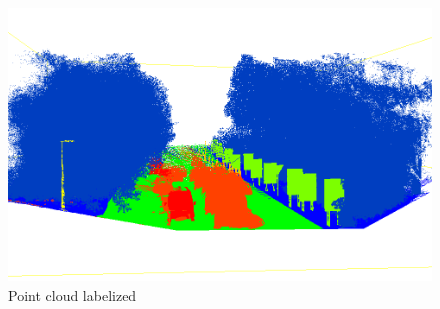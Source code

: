\begin{figure}[H]
    \centering
	\includegraphics[scale=0.3]{sources/pic2.png}
	\caption{Point cloud labelized}
	\label{pic2}
\end{figure}
